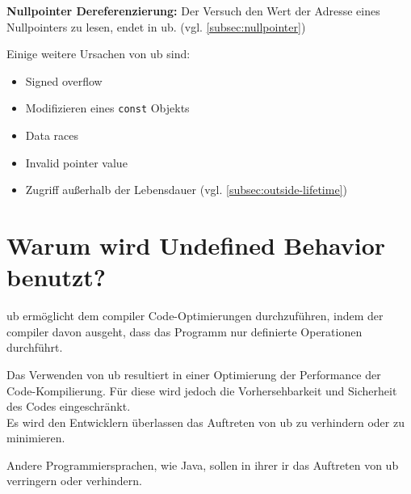 \textbf{Nullpointer Dereferenzierung:} Der Versuch den Wert der Adresse eines Nullpointers zu lesen, endet in \gls{ub}. \cite[S.188]{book:cpp-standard} (vgl. \ref{subsec:nullpointer})

Einige weitere Ursachen von \gls{ub} sind:
\begin{itemize}
    \item Signed overflow \cite[S.74]{book:cpp-standard}
    \item Modifizieren eines \verb|const| Objekts \cite[S.174]{book:cpp-standard}
    \item Data races \cite[S.1376]{book:cpp-standard}
    \item Invalid pointer value \cite[S.67]{book:cpp-standard}
    \item Zugriff außerhalb der Lebensdauer \cite[S.35]{book:cpp-standard} (vgl. \ref{subsec:outside-lifetime})
\end{itemize}

\section{Warum wird Undefined Behavior benutzt?}
\label{sec:ub_warum}

\gls{ub} ermöglicht dem \gls{compiler} Code-Optimierungen durchzuführen, indem der \gls{compiler} davon ausgeht, dass das Programm nur definierte Operationen durchführt. \cite[S.633]{book:taming-ub}

Das Verwenden von \gls{ub} resultiert in einer Optimierung der Performance der Code-Kompilierung. Für diese wird jedoch die Vorhersehbarkeit und Sicherheit des Codes eingeschränkt. \cite[S.633]{book:taming-ub} \\
Es wird den Entwicklern überlassen das Auftreten von \gls{ub} zu verhindern oder zu minimieren.

Andere Programmiersprachen, wie Java, sollen in ihrer \gls{ir} das Auftreten von \gls{ub} verringern oder verhindern. \cite[S.633]{book:taming-ub}